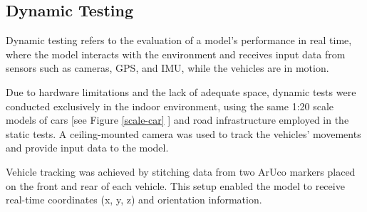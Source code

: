 \subsection{Dynamic Testing}

Dynamic testing refers to the evaluation of a model’s performance in real time, where the model interacts with the environment and receives input data from sensors such as cameras, GPS, and IMU, while the vehicles are in motion.

Due to hardware limitations and the lack of adequate space, dynamic tests were conducted exclusively in the indoor environment, using the same 1:20 scale models of cars [see Figure \ref{scale-car} ] and road infrastructure employed in the static tests. A ceiling-mounted camera was used to track the vehicles' movements and provide input data to the model.

Vehicle tracking was achieved by stitching data from two ArUco markers placed on the front and rear of each vehicle. This setup enabled the model to receive real-time coordinates (x, y, z) and orientation information.
